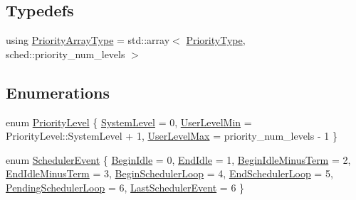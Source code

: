 \subsection*{Typedefs}
\begin{DoxyCompactItemize}
\item 
using \hyperlink{namespacevt_1_1sched_a2dbd1daff26f79efbff3f418ad9b2a8b}{Priority\+Array\+Type} = std\+::array$<$ \hyperlink{namespacevt_a86bff9f556eb761b27fc8600d006ac04}{Priority\+Type}, sched\+::priority\+\_\+num\+\_\+levels $>$
\end{DoxyCompactItemize}
\subsection*{Enumerations}
\begin{DoxyCompactItemize}
\item 
enum \hyperlink{namespacevt_1_1sched_a2857a110a140d0a9f77d374c90eb498b}{Priority\+Level} \{ \hyperlink{namespacevt_1_1sched_a2857a110a140d0a9f77d374c90eb498ba17c6729b868f4c633d17ba760a875cae}{System\+Level} = 0, 
\hyperlink{namespacevt_1_1sched_a2857a110a140d0a9f77d374c90eb498baee78e11eb2efcad3e8f54d60271ef6b6}{User\+Level\+Min} = Priority\+Level\+:\+:System\+Level + 1, 
\hyperlink{namespacevt_1_1sched_a2857a110a140d0a9f77d374c90eb498bada7b4271cb9b277f573951caa83f8128}{User\+Level\+Max} = priority\+\_\+num\+\_\+levels -\/ 1
 \}
\item 
enum \hyperlink{namespacevt_1_1sched_a54756ec39b60951d6765fcfa692d1616}{Scheduler\+Event} \{ \newline
\hyperlink{namespacevt_1_1sched_a54756ec39b60951d6765fcfa692d1616a8bbf26915a1dd443fc831173eef2a5c2}{Begin\+Idle} = 0, 
\hyperlink{namespacevt_1_1sched_a54756ec39b60951d6765fcfa692d1616a18303c08c4ee52b363809a1b302fd807}{End\+Idle} = 1, 
\hyperlink{namespacevt_1_1sched_a54756ec39b60951d6765fcfa692d1616a72d613b13201f766d3fc9d15c41ad6b5}{Begin\+Idle\+Minus\+Term} = 2, 
\hyperlink{namespacevt_1_1sched_a54756ec39b60951d6765fcfa692d1616addd8bd380a885eec328be20b317db5f1}{End\+Idle\+Minus\+Term} = 3, 
\newline
\hyperlink{namespacevt_1_1sched_a54756ec39b60951d6765fcfa692d1616aef46509b0036c1d7ed074229a9d44fdf}{Begin\+Scheduler\+Loop} = 4, 
\hyperlink{namespacevt_1_1sched_a54756ec39b60951d6765fcfa692d1616ac5e4d564fc096f6e9e7a4e43347dc98c}{End\+Scheduler\+Loop} = 5, 
\hyperlink{namespacevt_1_1sched_a54756ec39b60951d6765fcfa692d1616aa75e330bc5c4f9fd26dad998d5b20df4}{Pending\+Scheduler\+Loop} = 6, 
\hyperlink{namespacevt_1_1sched_a54756ec39b60951d6765fcfa692d1616a51c718670af733bf6cdb3c39ed9ce42d}{Last\+Scheduler\+Event} = 6
 \}
\end{DoxyCompactItemize}
